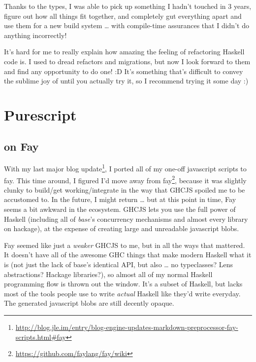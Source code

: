 \documentclass[]{article}
\renewcommand{\href}[2]{#2\footnote{\url{#1}}}
\begin{document}
Thanks to the types, I was able to pick up something I hadn't touched in 3
years, figure out how all things fit together, and completely gut everything
apart and use them for a new build system \ldots{} with compile-time assurances
that I didn't do anything incorrectly!

It's hard for me to really explain how amazing the feeling of refactoring
Haskell code is. I used to dread refactors and migrations, but now I look
forward to them and find any opportunity to do one! :D It's something that's
difficult to convey the sublime joy of until you actually try it, so I recommend
trying it some day :)

\hypertarget{purescript}{%
\section{Purescript}\label{purescript}}

\hypertarget{on-fay}{%
\subsection{on Fay}\label{on-fay}}

With my
\href{http://blog.jle.im/entry/blog-engine-updates-markdown-preprocessor-fay-scripts.html\#fay}{last
major blog update}, I ported all of my one-off javascript scripts to fay. This
time around, I figured I'd move away from
\href{https://github.com/faylang/fay/wiki}{fay}, because it was slightly clunky
to build/get working/integrate in the way that GHCJS spoiled me to be accustomed
to. In the future, I might return \ldots{} but at this point in time, Fay seems
a bit awkward in the ecosystem. GHCJS lets you use the full power of Haskell
(including all of \emph{base}'s concurrency mechanisms and almost every library
on hackage), at the expense of creating large and unreadable javascript blobs.

Fay seemed like just a \emph{weaker} GHCJS to me, but in all the ways that
mattered. It doesn't have all of the awesome GHC things that make modern Haskell
what it is (not just the lack of base's identical API, but also \ldots{} no
typeclasses? Lens abstractions? Hackage libraries?), so almost all of my normal
Haskell programming flow is thrown out the window. It's a subset of Haskell, but
lacks most of the tools people use to write \emph{actual} Haskell like they'd
write everyday. The generated javascript blobs are still decently opaque.
\end{document}

